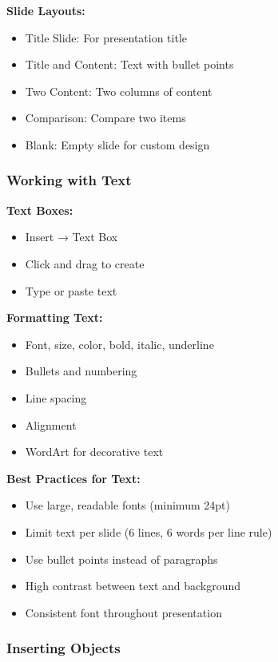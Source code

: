 \documentclass[12pt,a4paper]{article}
\begin{document}
\textbf{Slide Layouts:}
\begin{itemize}
    \item Title Slide: For presentation title
    \item Title and Content: Text with bullet points
    \item Two Content: Two columns of content
    \item Comparison: Compare two items
    \item Blank: Empty slide for custom design
\end{itemize}

\subsubsection{Working with Text}

\textbf{Text Boxes:}
\begin{itemize}
    \item Insert → Text Box
    \item Click and drag to create
    \item Type or paste text
\end{itemize}

\textbf{Formatting Text:}
\begin{itemize}
    \item Font, size, color, bold, italic, underline
    \item Bullets and numbering
    \item Line spacing
    \item Alignment
    \item WordArt for decorative text
\end{itemize}

\textbf{Best Practices for Text:}
\begin{itemize}
    \item Use large, readable fonts (minimum 24pt)
    \item Limit text per slide (6 lines, 6 words per line rule)
    \item Use bullet points instead of paragraphs
    \item High contrast between text and background
    \item Consistent font throughout presentation
\end{itemize}

\subsubsection{Inserting Objects}
\end{document}
